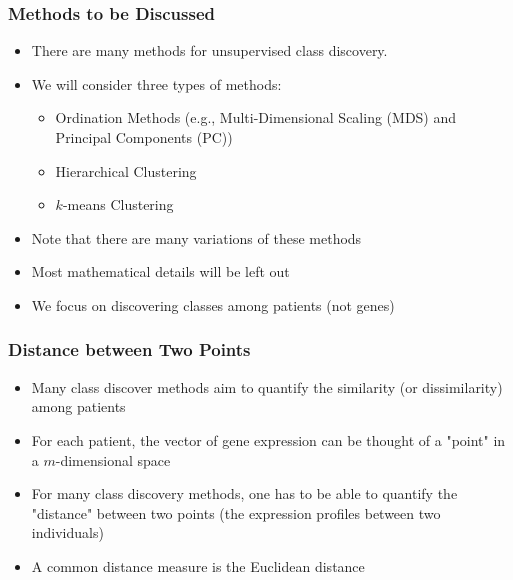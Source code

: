 \documentclass[xcolor=x11names,compress]{beamer}\usepackage[]{graphicx}\usepackage[]{color}
\begin{document}
\begin{frame}
  \frametitle{Methods to be Discussed}
  \begin{itemize}
\item There are many methods for unsupervised class 
      discovery.
\item We will consider three types of methods:
  \begin{itemize}
  \item Ordination Methods (e.g., Multi-Dimensional Scaling (MDS) and Principal Components (PC))
  \item Hierarchical Clustering
  \item $k$-means Clustering
  \end{itemize}
\item Note that there are many variations of these methods
\item Most mathematical details will be left out
\item We focus on discovering classes among patients (not genes)
\end{itemize}
\end{frame}


\begin{frame}
  \frametitle{Distance between Two Points}
  \begin{itemize}
\item Many class discover methods aim to quantify the similarity
      (or dissimilarity) among patients
\item For each patient, the vector of gene expression can be thought
      of a "point" in a $m$-dimensional space
\item For many class discovery methods, one has to be able to quantify
      the "distance" between two points (the expression profiles
      between two individuals)
\item A common distance measure is the Euclidean distance
\end{itemize}

\end{frame}
\end{document}

